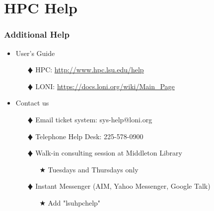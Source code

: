 \documentclass[slidestop,mathserif,compress,xcolor=svgnames,table]{beamer}
\newenvironment{eblock}[0]
{
\begin{beamerboxesrounded}[upper=uppercol2,lower=lowercol2,shadow=true]}
{\end{beamerboxesrounded}}
\begin{document}
\section{HPC Help}
\begin{frame}
  \frametitle{\small Additional Help}
  \begin{itemize}
    \item User's Guide
    \begin{enumerate}
      \item[$\vardiamond$]HPC: \url{http://www.hpc.lsu.edu/help}
      \item[$\vardiamond$]LONI: \url{https://docs.loni.org/wiki/Main_Page}
    \end{enumerate}
    \item Contact us
    \begin{enumerate}
      \item[$\vardiamond$]Email ticket system: sys-help@loni.org
      \item[$\vardiamond$]Telephone Help Desk: 225-578-0900
      \item[$\vardiamond$]Walk-in consulting session at Middleton Library
      \begin{enumerate}
	\item[$\bigstar$]Tuesdays and Thursdays only
      \end{enumerate}
      \item[$\vardiamond$]Instant Messenger (AIM, Yahoo Messenger, Google Talk)
      \begin{enumerate}
	\item[$\bigstar$]Add "lsuhpchelp"
      \end{enumerate}
    \end{enumerate}
  \end{itemize}
\end{frame} 

\begin{frame}
  \frametitle{\small  }
  \vspace{1.2cm}
  \begin{eblock}{}
  \end{eblock}
\end{frame}
\end{document}
